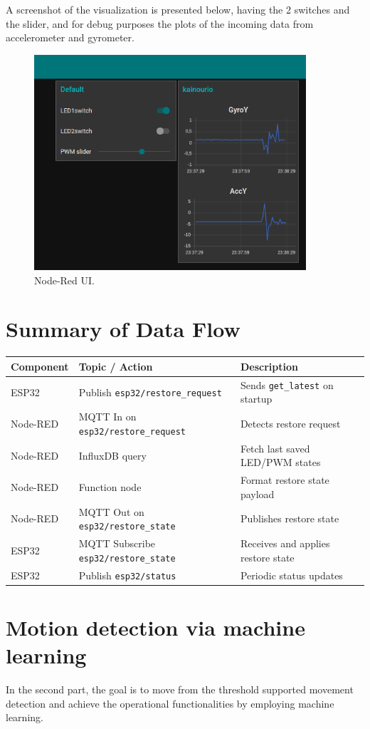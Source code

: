 \documentclass[a4paper,12pt]{article}
\begin{document}
	
	A screenshot of the visualization is presented below, having the 2 switches and the slider,
	and for debug purposes the plots of the incoming data from accelerometer and gyrometer.

		\begin{figure}[H]
			\centering
			\includegraphics[width=0.9\textwidth]{ui_threshold.png}
			\caption{Node-Red UI.}
			\label{fig1:}
		\end{figure}		


\section{Summary of Data Flow}

\begin{center}
\begin{tabular}{|l|l|l|}
\hline
\textbf{Component} & \textbf{Topic / Action} & \textbf{Description} \\
\hline
ESP32 & Publish \texttt{esp32/restore\_request} & Sends \texttt{get\_latest} on startup \\
Node-RED & MQTT In on \texttt{esp32/restore\_request} & Detects restore request \\
Node-RED & InfluxDB query & Fetch last saved LED/PWM states \\
Node-RED & Function node & Format restore state payload \\
Node-RED & MQTT Out on \texttt{esp32/restore\_state} & Publishes restore state \\
ESP32 & MQTT Subscribe \texttt{esp32/restore\_state} & Receives and applies restore state \\
ESP32 & Publish \texttt{esp32/status} & Periodic status updates \\
\hline
\end{tabular}
\end{center}



\section{Motion detection via machine learning}

In the second part, the goal is to move from the threshold supported movement detection and achieve the 
operational functionalities by employing machine learning.
\end{document}

